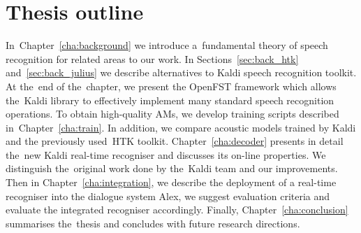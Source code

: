 \section*{Thesis outline} 
In~Chapter~\ref{cha:background} we introduce a~fundamental theory of speech recognition for related areas to our work.
In Sections~\ref{sec:back_htk} and~\ref{sec:back_julius} we describe alternatives to Kaldi speech recognition toolkit. 
At the~end of the~chapter, we present the OpenFST framework which allows the~Kaldi library to effectively implement many standard speech recognition operations. 
To obtain high-quality \aclp{AM}, we develop training scripts described in~Chapter~\ref{cha:train}. 
In addition, we compare acoustic models trained by Kaldi and the previously used~\ac{HTK} toolkit. 
Chapter~\ref{cha:decoder} presents in detail the~new Kaldi real-time recogniser and discusses its on-line properties.
We distinguish the~original work done by the~Kaldi team and our improvements. 
Then in Chapter~\ref{cha:integration}, we describe the deployment of a real-time recogniser into the dialogue system Alex, we suggest evaluation criteria and evaluate the integrated recogniser accordingly.
Finally, Chapter~\ref{cha:conclusion} summarises the~thesis and concludes with future research directions.

